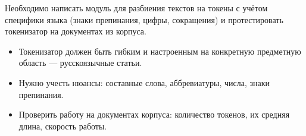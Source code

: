 
Необходимо написать модуль для разбиения текстов на токены с учётом специфики
языка (знаки препинания, цифры, сокращения) и протестировать токенизатор на
документах из корпуса.

\begin{itemize}
    \item Токенизатор должен быть гибким и настроенным на конкретную предметную
    область --- русскоязычные статьи.
    \item Нужно учесть нюансы: составные слова, аббревиатуры, числа, знаки
    препинания.
    \item Проверить работу на документах корпуса: количество токенов, их
    средняя длина, скорость работы.
\end{itemize}
